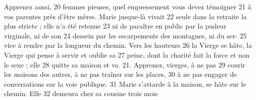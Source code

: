 Apprenez aussi,	 
20	 	femmes pieuses, quel empressement vous devez témoigner	 
21	 	à vos parentes près d'être mères. Marie jusque-là vivait	 
22	 	seule dans la retraite la plus stricte ; elle n'a été retenue	 
23	 	ni de paraître en public par la pudeur virginale, ni de son	 
24	 	dessein par les escarpements des montagnes, ni du ser-	 
25	 	vice à rendre par la longueur du chemin. Vers les hauteurs	 
26	 	la Vierge se hâte, la Vierge qui pense à servir et oublie sa	 
27	 	peine, dont la charité fait la force et non le sexe ; elle	 
28	 	quitte sa maison et va. 21. Apprenez, vierges, à ne pas	 
29	 	courir les maisons des autres, à ne pas traîner sur les places,	 
30	 	à ne pas engager de conversations sur la voie publique.	 
31	 	Marie s'attarde à la maison, se hâte sur le chemin. Elle	 
32	 	demeura chez sa cousine trois mois